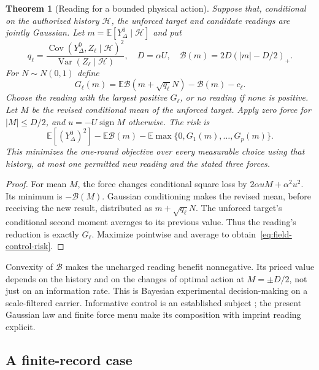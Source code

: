 \documentclass[12pt,a4paper]{article}
\newtheorem{theorem}{Theorem}[section]
\newcommand{\E}{\mathbb E}
\newcommand{\Var}{\operatorname{Var}}
\begin{document}
\begin{theorem}[Reading for a bounded physical action]
\label{thm:reading-action}
Suppose that, conditional on the authorized history $\mathcal H$,
the unforced target and candidate readings are jointly Gaussian.
Let $m=\E[Y_\Delta^0\mid\mathcal H]$ and put
\[
 q_\ell=
 \frac{\operatorname{Cov}(Y_\Delta^0,Z_\ell\mid\mathcal H)^2}
 {\Var(Z_\ell\mid\mathcal H)},\quad D=\alpha U,\quad
 \mathcal B(m)=2D(|m|-D/2)_+.
\]
For $N\sim N(0,1)$ define
\begin{equation}\label{eq:action-reading-value}
 G_\ell(m)=\E\mathcal B(m+\sqrt{q_\ell}N)-\mathcal B(m)-c_\ell.
\end{equation}
Choose the reading with the largest positive $G_\ell$, or no reading
if none is positive. Let $M$ be the revised conditional mean of the
unforced target. Apply zero force for $|M|\leq D/2$, and
$u=-U\operatorname{sign}M$ otherwise. The risk is
\begin{equation}\label{eq:field-control-risk}
 \E[(Y_\Delta^0)^2]-\E\mathcal B(m)
 -\E\max\{0,G_1(m),\ldots,G_p(m)\}.
\end{equation}
This minimizes the one-round objective over every measurable choice
using that history, at most one permitted new reading and the stated
three forces.
\end{theorem}
\begin{proof}
For mean $M$, the force changes conditional square loss by
$2\alpha uM+\alpha^2u^2$. Its minimum is $-\mathcal B(M)$.
Gaussian conditioning makes the revised mean, before receiving the
new result, distributed as $m+\sqrt{q_\ell}N$. The unforced target's
conditional second moment averages to its previous value. Thus
the reading's reduction is exactly $G_\ell$. Maximize pointwise
and average to obtain~\eqref{eq:field-control-risk}.
\end{proof}

Convexity of $\mathcal B$ makes the uncharged reading benefit
nonnegative. Its priced value depends on the history and on the
changes of optimal action at $M=\pm D/2$, not just on an information
rate. This is Bayesian experimental decision-making on a
scale-filtered carrier. Informative control is an established subject
\cite{KlenskeHennig}; the present Gaussian law and finite force menu
make its composition with imprint reading explicit.

\subsection{A finite-record case}
\end{document}
